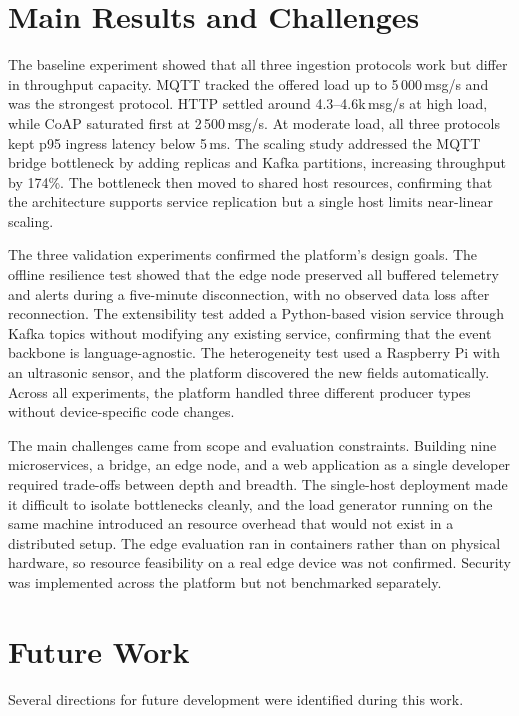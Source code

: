 \section{Main Results and Challenges}

The baseline experiment showed that all three ingestion protocols work but differ in throughput capacity. \gls{MQTT} tracked the offered load up to 5\,000\,msg/s and was the strongest protocol. \gls{HTTP} settled around 4.3--4.6k\,msg/s at high load, while \gls{CoAP} saturated first at 2\,500\,msg/s. At moderate load, all three protocols kept p95 ingress latency below 5\,ms. The scaling study addressed the \gls{MQTT} bridge bottleneck by adding replicas and Kafka partitions, increasing throughput by 174\%. The bottleneck then moved to shared host resources, confirming that the architecture supports service replication but a single host limits near-linear scaling.

The three validation experiments confirmed the platform's design goals. The offline resilience test showed that the edge node preserved all buffered telemetry and alerts during a five-minute disconnection, with no observed data loss after reconnection. The extensibility test added a Python-based vision service through Kafka topics without modifying any existing service, confirming that the event backbone is language-agnostic. The heterogeneity test used a Raspberry Pi with an ultrasonic sensor, and the platform discovered the new fields automatically. Across all experiments, the platform handled three different producer types without device-specific code changes.

The main challenges came from scope and evaluation constraints. Building nine microservices, a bridge, an edge node, and a web application as a single developer required trade-offs between depth and breadth. The single-host deployment made it difficult to isolate bottlenecks cleanly, and the load generator running on the same machine introduced an resource overhead that would not exist in a distributed setup. The edge evaluation ran in containers rather than on physical hardware, so resource feasibility on a real edge device was not confirmed. Security was implemented across the platform but not benchmarked separately.

\section{Future Work}
\label{sec:FutureWork}

Several directions for future development were identified during this work.

